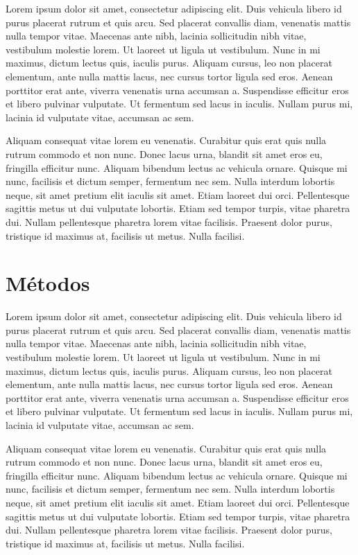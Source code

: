 \documentclass[a4paper,10pt]{article}
\begin{document}
 Lorem ipsum dolor sit amet, consectetur adipiscing elit. Duis vehicula libero id purus placerat rutrum et quis arcu. Sed placerat convallis diam, venenatis mattis nulla tempor vitae. Maecenas ante nibh, lacinia sollicitudin nibh vitae, vestibulum molestie lorem. Ut laoreet ut ligula ut vestibulum. Nunc in mi maximus, dictum lectus quis, iaculis purus. Aliquam cursus, leo non placerat elementum, ante nulla mattis lacus, nec cursus tortor ligula sed eros. Aenean porttitor erat ante, viverra venenatis urna accumsan a. Suspendisse efficitur eros et libero pulvinar vulputate. Ut fermentum sed lacus in iaculis. Nullam purus mi, lacinia id vulputate vitae, accumsan ac sem.

Aliquam consequat vitae lorem eu venenatis. Curabitur quis erat quis nulla rutrum commodo et non nunc. Donec lacus urna, blandit sit amet eros eu, fringilla efficitur nunc. Aliquam bibendum lectus ac vehicula ornare. Quisque mi nunc, facilisis et dictum semper, fermentum nec sem. Nulla interdum lobortis neque, sit amet pretium elit iaculis sit amet. Etiam laoreet dui orci. Pellentesque sagittis metus ut dui vulputate lobortis. Etiam sed tempor turpis, vitae pharetra dui. Nullam pellentesque pharetra lorem vitae facilisis. Praesent dolor purus, tristique id maximus at, facilisis ut metus. Nulla facilisi. 

\section{Métodos}

 Lorem ipsum dolor sit amet, consectetur adipiscing elit. Duis vehicula libero id purus placerat rutrum et quis arcu. Sed placerat convallis diam, venenatis mattis nulla tempor vitae. Maecenas ante nibh, lacinia sollicitudin nibh vitae, vestibulum molestie lorem. Ut laoreet ut ligula ut vestibulum. Nunc in mi maximus, dictum lectus quis, iaculis purus. Aliquam cursus, leo non placerat elementum, ante nulla mattis lacus, nec cursus tortor ligula sed eros. Aenean porttitor erat ante, viverra venenatis urna accumsan a. Suspendisse efficitur eros et libero pulvinar vulputate. Ut fermentum sed lacus in iaculis. Nullam purus mi, lacinia id vulputate vitae, accumsan ac sem.

Aliquam consequat vitae lorem eu venenatis. Curabitur quis erat quis nulla rutrum commodo et non nunc. Donec lacus urna, blandit sit amet eros eu, fringilla efficitur nunc. Aliquam bibendum lectus ac vehicula ornare. Quisque mi nunc, facilisis et dictum semper, fermentum nec sem. Nulla interdum lobortis neque, sit amet pretium elit iaculis sit amet. Etiam laoreet dui orci. Pellentesque sagittis metus ut dui vulputate lobortis. Etiam sed tempor turpis, vitae pharetra dui. Nullam pellentesque pharetra lorem vitae facilisis. Praesent dolor purus, tristique id maximus at, facilisis ut metus. Nulla facilisi. 
\end{document}
